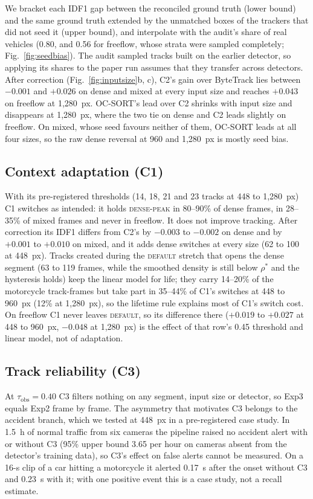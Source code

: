 \documentclass[twocolumn]{svjour3}
\begin{document}
We bracket each IDF1 gap between the reconciled ground truth (lower bound) and
the same ground truth extended by the unmatched boxes of the trackers that did
not seed it (upper bound), and interpolate with the audit's share of real
vehicles (0.80, and 0.56 for freeflow, whose strata were sampled completely;
Fig.~\ref{fig:seedbias}).
The audit sampled tracks built on the earlier detector, so applying its shares
to the paper run assumes that they transfer across detectors. After correction
(Fig.~\ref{fig:inputsize}b, c), C2's gain over ByteTrack lies between $-0.001$ and
$+0.026$ on dense and mixed at every input size and reaches $+0.043$ on
freeflow at 1,280~px. OC-SORT's lead over C2 shrinks with input size and
disappears at 1,280~px, where the two tie on dense and C2 leads slightly on
freeflow. On mixed, whose seed favours neither of them, OC-SORT leads at all
four sizes, so the raw dense reversal at 960 and 1,280~px is mostly seed bias.

\subsection{Context adaptation (C1)}\label{subsec:c1-results}

With its pre-registered thresholds (14, 18, 21 and 23 tracks at 448 to
1,280~px) C1 switches as intended: it holds \textsc{dense-peak} in 80--90\% of
dense frames, in 28--35\% of mixed frames and never in freeflow. It does not
improve tracking. After correction its IDF1 differs from C2's by $-0.003$ to
$-0.002$ on dense and by $+0.001$ to $+0.010$ on mixed, and it adds dense
switches at every size (62 to 100 at 448~px).
Tracks created during the \textsc{default} stretch that opens the dense segment
(63 to 119 frames, while the smoothed density is still below $\rho^{*}$ and the
hysteresis holds) keep the linear model for life; they carry 14--20\% of the
motorcycle track-frames but take part in 35--44\% of C1's switches at 448 to
960~px (12\% at 1,280~px), so the lifetime rule explains most of C1's switch
cost. On freeflow C1 never leaves \textsc{default}, so its difference there
($+0.019$ to $+0.027$ at 448 to 960~px, $-0.048$ at 1,280~px) is the effect of
that row's 0.45 threshold and linear model, not of adaptation.

\subsection{Track reliability (C3)}\label{subsec:c3-results}

At $\tau_{\mathrm{obs}}=0.40$ C3 filters nothing on any segment, input size or
detector, so Exp3 equals Exp2 frame by frame. The asymmetry that motivates C3
belongs to the accident branch, which we tested at 448~px in a pre-registered
case study. In 1.5~h of normal traffic from six cameras the pipeline raised no
accident alert with or without C3 (95\% upper bound 3.65 per hour on cameras
absent from the detector's training data), so C3's effect on false alerts
cannot be measured. On a 16-s clip of a car hitting a motorcycle it alerted
0.17~s after the onset without C3 and 0.23~s with it; with one positive event
this is a case study, not a recall estimate.
\end{document}
